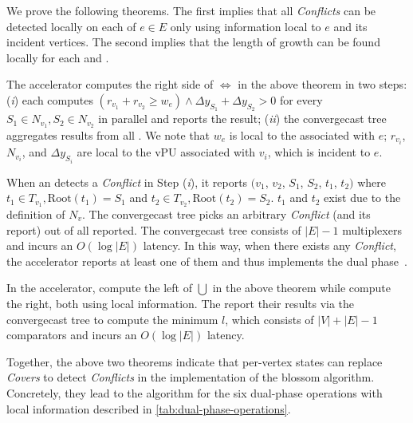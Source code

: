 We prove the following theorems. The first implies that all \emph{Conflicts} can be detected locally on each \pue of $e \in E$ only using information local to $e$ and its incident vertices.
The second implies that the length of growth can be found locally for each \puv and \pue.

\vspace{1ex}
\vspace{1ex}

The accelerator computes 
the right side of $\Longleftrightarrow$ in the above theorem in two steps: (\textit{i}) each \pue computes $(r_{v_1} + r_{v_2} \ge w_e) \land \Delta y_{S_1} + \Delta y_{S_2} > 0$ for every $S_1 \in N_{v_1}, S_2 \in N_{v_2}$ in parallel and reports the result; (\textit{ii}) the convergecast tree aggregates results from all \pues. 
We note that $w_e$ is local to the \pue associated with $e$; $r_{v_i}$, $N_{v_i}$, and $\Delta y_{S_i}$ are local to the vPU associated with $v_i$, which is incident to $e$.

When an \pue detects a \emph{Conflict} in Step (\textit{i}), it reports $(v_1$, $v_2$, $S_1$, $S_2$, $t_1$, $t_2)$ where $t_1 \in T_{v_1}, \text{Root}(t_1) = S_1$ and $t_2 \in T_{v_2}, \text{Root}(t_2) = S_2$. $t_1$ and $t_2$ exist due to the definition of $N_v$.
The convergecast tree picks an arbitrary \emph{Conflict} (and its report) out of all reported.
The convergecast tree consists of $|E|-1$ multiplexers and incurs an $O(\log |E|)$ latency.
In this way, when there exists any \emph{Conflict}, the accelerator reports at least one of them and thus implements the dual phase~\cite{wu2023qce}.

\vspace{1ex}
 
In the accelerator, \puvs compute the left of $\bigcup$  in the above theorem while \pues compute the right, both using local information.
The \pus report their results via the convergecast tree to compute the minimum $l$, which consists of $|V|+|E|-1$ comparators and incurs an $O(\log|E|)$ latency.

Together, the above two theorems indicate that per-vertex states can replace \emph{Covers} to detect \emph{Conflicts} in the implementation of the blossom algorithm.
Concretely, they lead to the algorithm for the six dual-phase operations with local information described in \autoref{tab:dual-phase-operations}.

